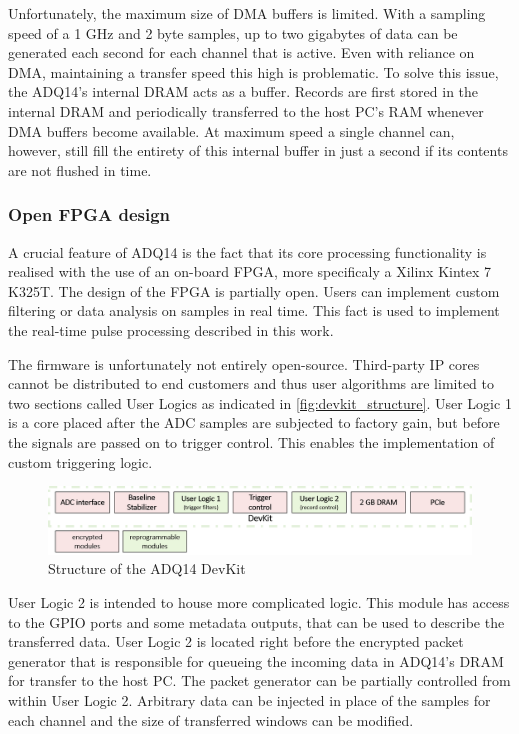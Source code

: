 Unfortunately, the maximum size of DMA buffers is limited. 
With a sampling speed of a 1 GHz and 2 byte samples, up 
to two gigabytes of data can be generated each second for each
channel that is active. Even with reliance on DMA, maintaining 
a transfer speed this high is problematic. To solve this issue, 
the ADQ14's internal DRAM acts as a buffer.
Records are first stored in the internal DRAM and periodically
transferred to the host PC's RAM whenever DMA buffers become available.
At maximum speed a single channel can, however, still fill the entirety
of this internal buffer in just a second if its contents are not flushed in time.

\subsubsection{Open FPGA design} \label{ssec:adq_devkit}

A crucial feature of ADQ14 is the fact that its core processing
functionality is realised with the use of an on-board FPGA,
more specificaly a Xilinx Kintex 7 K325T. The design of the FPGA
is partially open. Users can implement custom
filtering or data analysis on samples in real time.
This fact is used to implement the real-time pulse processing described in this work.


The firmware is unfortunately not entirely open-source.
Third-party IP cores cannot be distributed to end customers 
and thus user algorithms are limited to two sections called User Logics
as indicated in \autoref{fig:devkit_structure}.
User Logic 1 is a core placed after the ADC samples are subjected to factory
gain, but before the signals are passed on to trigger control.
This enables the implementation of custom triggering logic.

\begin{figure}[H]
  \centering
  \includegraphics[width=\linewidth]{media/devkit_structure.png}
  \caption{Structure of the ADQ14 DevKit}
  \label{fig:devkit_structure} 
\end{figure}


User Logic 2 is intended to house more complicated logic.
This module has access to the GPIO ports and some metadata
outputs, that can be used to describe the transferred data.
User Logic 2 is located right before the encrypted packet generator
that is responsible for queueing the incoming data in ADQ14's DRAM 
for transfer to the host PC. The packet generator can be partially
controlled from within User Logic 2. Arbitrary data can be injected
in place of the samples for each channel and the size of transferred windows 
can be modified.

